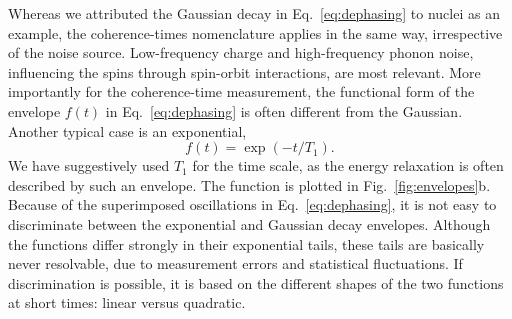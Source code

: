 \documentclass[aps, prx, showpacs, twocolumn, superscriptaddress, notitlepage, longbibliography, floatfix, nofootinbib]{revtex4-2}
\begin{document}
Whereas we attributed the Gaussian decay in Eq.~\eqref{eq:dephasing} to nuclei as an example, the coherence-times nomenclature applies in the same way, irrespective of the noise source. Low-frequency charge and high-frequency phonon noise, influencing the spins through spin-orbit interactions, are most relevant. More importantly for the coherence-time measurement, the functional form of the envelope $f(t)$ in Eq.~\eqref{eq:dephasing} is often different from the Gaussian. Another typical case is an exponential,
\begin{equation}
f(t) = \exp(-t / T_1).
\label{eq:relaxation}
\end{equation}
We have suggestively used $T_1$ for the time scale, as the energy relaxation is often described by such an envelope. The function is plotted in Fig.~\ref{fig:envelopes}b. Because of the superimposed oscillations in Eq.~\eqref{eq:dephasing}, it is not easy to discriminate between the exponential and Gaussian decay envelopes. Although the functions differ strongly in their exponential tails, these tails are basically never resolvable, due to measurement errors and statistical fluctuations. If discrimination is possible, it is based on the different shapes of the two functions at short times: linear versus quadratic.
\end{document}
